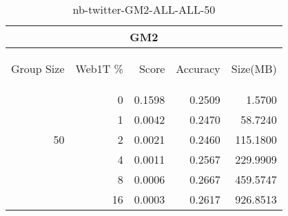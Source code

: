 \begin{center}
\begin{table}[htbp] 
 \begin{center}
\begin{tabular}{ | r | r | r | r | r |}
\hline
\multicolumn{5}{|c|}{GM2}\\
\hline
\begin{sideways}Group Size\end{sideways} & \begin{sideways}Web1T \%\end{sideways} & \begin{sideways}Score\end{sideways} & \begin{sideways}Accuracy\end{sideways} & \begin{sideways}Size(MB)\end{sideways}\\
\hline
\multirow{5}{*}{50}
 & 0 & 0.1598 & 0.2509 & 1.5700\\ \cline{2-5}
 & 1 & 0.0042 & 0.2470 & 58.7240\\ \cline{2-5}
 & 2 & 0.0021 & 0.2460 & 115.1800\\ \cline{2-5}
 & 4 & 0.0011 & 0.2567 & 229.9909\\ \cline{2-5}
 & 8 & 0.0006 & 0.2667 & 459.5747\\ \cline{2-5}
 & 16 & 0.0003 & 0.2617 & 926.8513\\ \cline{2-5}
\hline
\end{tabular}
\caption{nb-twitter-GM2-ALL-ALL-50}
\label{table:nb-twitter-GM2-ALL-ALL-50}
\end{center}
 \end{table}
\end{center}

